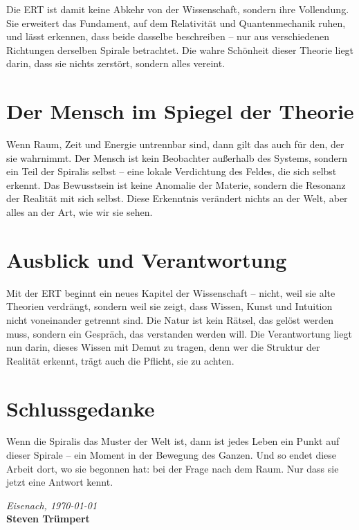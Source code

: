Die ERT ist damit keine Abkehr von der Wissenschaft, sondern ihre Vollendung.  
Sie erweitert das Fundament, auf dem Relativität und Quantenmechanik ruhen,  
und lässt erkennen, dass beide dasselbe beschreiben –  
nur aus verschiedenen Richtungen derselben Spirale betrachtet.  
Die wahre Schönheit dieser Theorie liegt darin,  
dass sie nichts zerstört, sondern alles vereint.

\section*{Der Mensch im Spiegel der Theorie}
Wenn Raum, Zeit und Energie untrennbar sind,  
dann gilt das auch für den, der sie wahrnimmt.  
Der Mensch ist kein Beobachter außerhalb des Systems,  
sondern ein Teil der Spiralis selbst –  
eine lokale Verdichtung des Feldes, die sich selbst erkennt.  
Das Bewusstsein ist keine Anomalie der Materie,  
sondern die Resonanz der Realität mit sich selbst.  
Diese Erkenntnis verändert nichts an der Welt,  
aber alles an der Art, wie wir sie sehen.

\section*{Ausblick und Verantwortung}
Mit der ERT beginnt ein neues Kapitel der Wissenschaft –  
nicht, weil sie alte Theorien verdrängt,  
sondern weil sie zeigt, dass Wissen, Kunst und Intuition  
nicht voneinander getrennt sind.  
Die Natur ist kein Rätsel, das gelöst werden muss,  
sondern ein Gespräch, das verstanden werden will.  
Die Verantwortung liegt nun darin, dieses Wissen mit Demut zu tragen,  
denn wer die Struktur der Realität erkennt,  
trägt auch die Pflicht, sie zu achten.

\section*{Schlussgedanke}
Wenn die Spiralis das Muster der Welt ist,  
dann ist jedes Leben ein Punkt auf dieser Spirale –  
ein Moment in der Bewegung des Ganzen.  
Und so endet diese Arbeit dort, wo sie begonnen hat:  
bei der Frage nach dem Raum.  
Nur dass sie jetzt eine Antwort kennt.

\vspace{20em}
\begin{flushright}
\textit{Eisenach, {\today}} 
\\[0.5em]
\textbf{Steven Trümpert}
\end{flushright}
